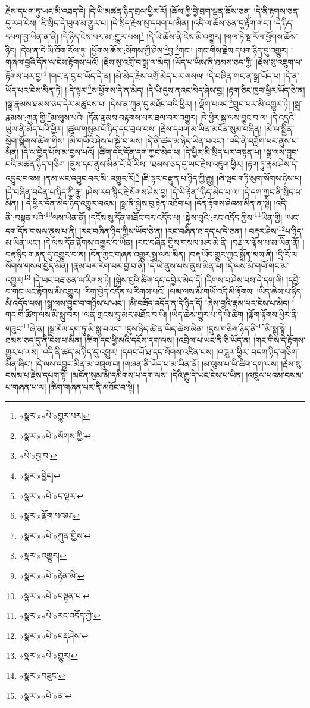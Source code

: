 རྗེས་དཔག་ཏུ་ཡང་མི་འཐད་དེ། །དེ་ཡི་མཚན་ཉིད་བྲལ་ཕྱིར་རོ། །ཆོས་ཀྱི་བྱེ་བྲག་ལྡན་ཆོས་ཅན། །དེ་ནི་རྟགས་ཅན་དུ་རབ་ངེས། །ཇི་སྲིད་དེ་ཡུལ་མ་གྱུར་པ། །དེ་སྲིད་རྗེས་སུ་དཔག་པ་མིན། །འདི་ལ་ཆོས་ཅན་དུ་རྟོག་གང་། །དེ་ཉིད་དཔག་བྱ་ཡིན་ན་ནི། །དེ་ཉིད་ངེས་པར་མ་:གྱུར་པས།\footnote{«སྣར་»«པེ་»གྱུར་པར།} །དེ་ཡི་ཆོས་ནི་ངེས་མི་འགྱུར། །གལ་ཏེ་སྔ་རོལ་ཕྱོགས་ཆོས་ཉིད། །དེས་ན་དེ་ཡི་འོག་རོལ་ཏུ། །ཕྱོགས་ཆོས་:སོགས་ཀྱི་ཤེས་\footnote{«སྣར་»«པེ་»སོགས་ཀྱི་}བྱ་\footnote{«པེ་»བྱ་བ་}གང་། །གང་གིས་རྗེས་དཔག་ཉིད་དུ་འགྱུར། །གཞལ་བྱའི་དོན་ལ་ངེས་རྟོགས་པའོ། །རྗེས་སུ་འགྲོ་བ་སྒྲ་ལ་མེད། །ཡོད་པ་ཡིས་ནི་ཐམས་ཅད་ཀྱི། །རྗེས་སུ་འཇུག་པ་རྟོགས་པར་བྱ།\footnote{«སྣར་»བྱེད།} །གང་ན་དུ་བ་ཡོད་དེ་ན། །མེ་མེད་རྗེས་འགྲོ་མེད་པར་གསལ། །དེ་བཞིན་གང་ན་སྒྲ་ཡོད་པ། །དེ་ན་ཡོད་པར་ངེས་མིན་ཏེ། །:དེ་ལྟར་\footnote{«སྣར་»«པེ་»ད་ལྟར་}ས་ཕྱོགས་དེ་ན་མེད། །དེ་ཡི་དུས་ནའང་མེད་ཤེས་བྱ། །རྟག་ཅིང་ཁྱབ་ཕྱིར་ཡོད་ཅེ་ན། །སྒྲ་རྣམས་ཐམས་ཅད་དེར་མཚུངས་པ། །དེས་ན་ཀུན་དུ་མཐོང་བའི་ཕྱིར། །:ལྡོག་པའང་\footnote{«སྣར་»ལྡོག་པའམ་}གྲུབ་པར་མི་འགྱུར་ཏེ། །སྒྲ་རྣམས་:ཀུན་གྱི་\footnote{«སྣར་»«པེ་»ཀུན་གྱིས་}མ་ལུས་པའི། །དོན་རྣམས་བརྟགས་པར་ཐལ་བར་འགྱུར། །དེ་ཕྱིར་སྒྲ་ལས་བྱུང་བ་ལ། །དེ་འདྲའི་ཡུལ་ནི་མེད་པའི་ཕྱིར། །ཚུལ་གསུམ་པོ་ཉིད་དང་བྲལ་བས། །རྗེས་དཔག་མ་ཡིན་མངོན་སུམ་བཞིན། །མེ་ལ་སྦྱིན་སྲེག་སྩོགས་ཚིག་གིས། །མི་གཡོའི་ཤེས་པ་སྐྱེ་བ་ལས། །དེ་ནི་ཚད་མ་ཉིད་ཡིན་པའང་། །འདི་ནི་བཟློག་པར་ནུས་པ་མིན། །དེ་ལ་བྱེད་པོས་མ་བྱས་པའོ། །ཚིག་དང་དོན་དག་ཀྱང་མེད་པ། །དེ་ཕྱིར་མི་སྲིད་པར་བསྟན་པ། །སྒྲ་ལས་བྱུང་བའི་མཚན་ཉིད་གཅིག །ནུས་དང་ནུས་མིན་ངོ་བོ་ཡིས། །ཐམས་ཅད་དུ་ཡང་རྗེས་འཇུག་ཕྱིར། །རྟག་ཏུ་རྣམ་ཤེས་དེ་འབྱུང་བའམ། །ནམ་ཡང་འབྱུང་བར་མི་:འགྱུར་རོ།\footnote{«སྣར་»འགྱུར།} །ཇི་ལྟར་བརྫུན་པ་ཉིད་ཀྱི་རྒྱུ། །ཞེ་སྡང་གཏི་མུག་སོགས་ཉེས་པ། །དེ་བཞིན་བདེན་པ་ཉིད་ཀྱི་རྒྱུ། །ཤེས་རབ་སྙིང་རྗེ་སོགས་ཤེས་བྱ། །དེ་ཡི་རྟེན་\footnote{«སྣར་»«པེ་»རྟེན་མི་}ཉིད་མེད་པ་ལ། །དེ་དག་ཀྱང་ནི་སྲིད་པ་མིན། །
དེ་ཕྱིར་དོན་མེད་ཉིད་འགྱུར་བའམ། །སྒྲ་ནི་སྐྱེས་བུ་རྟེན་འཐོབ་པ། །དོན་རྟོགས་ཤེའམ་མིན་ན་སྟེ། །འདི་ནི་:བསྟན་པའི་\footnote{«སྣར་»«པེ་»བསྟན་པ་}ལས་ཡིན་ནོ། །དངོས་སུ་དོན་མཐོང་བར་འདོད་པ། །སྐྱེས་བུའི་:རང་འདོད་ཀྱིས་\footnote{«སྣར་»«པེ་»རང་འདོད་ཀྱི་}ཡིན་གྱི། །ཡང་དག་དོན་གསལ་ནུས་པ་ནི། །རང་བཞིན་ཉིད་ཀྱིས་ཡོད་ཅེ་ན། །རང་བཞིན་ཐ་དད་པ་དེ་ཅན། །:བརྡར་ཤེས་\footnote{«སྣར་»«པེ་»བརྡ་ཤེས་}པ་ཉིད་མ་ཡིན་ཡང་། །དེ་ལས་དོན་རྟོགས་འགྱུར་བ་ཡིན། །རང་བཞིན་གྱིས་གསལ་མར་མེ་ནི། །བརྡ་ལ་ལྟོས་པ་མ་ཡིན་ནོ། །བརྡ་ཉིད་གཞན་དུ་འགྱུར་བ་ན། །དོན་ཀྱང་གཞན་འགྱུར་སྒྲ་ལས་མིན། །བརྡ་ཡོད་གྱུར་ཀྱང་སྒྲོན་མས་ནི། །དྲི་རོ་ལ་སོགས་གསལ་བྱེད་མིན། །རྣམ་པར་རིག་པར་བྱ་བ་ནི། །དེ་ཡི་ནུས་པས་ནུས་མིན་པ། །དེ་ལས་མི་གཡོ་གང་མ་འགྱུར།\footnote{«སྣར་»«པེ་»གྱུར།} །དེ་ཡང་བརྡ་ཅན་ལ་རིགས་ཏེ། །སྐྱེས་བུའི་ཚིག་དང་དབྱེར་མེད་དོ། །རིགས་པ་ཤེས་པས་དེ་དག་གི། །དབྱེ་བ་གང་ཡང་རྟོགས་མི་འགྱུར། །རིག་བྱེད་འདོན་པ་རིགས་པའོ། །ལམ་ལས་མི་གཡོ་འདི་མི་རྟོགས། །ཡིད་ཆེས་པ་ཉིད་མི་འདོད་པས། །སྒྲ་ལས་བྱུང་བ་གཉིས་པ་ཡང་། །མི་བཟོད་འདོད་ན་དེ་ཉིད་དོ། །ཞེས་བྱའི་རྣམ་པར་ངེས་པ་མེད། །གང་གི་ཚིག་ལས་མི་སླུ་བར། །ལན་གྲངས་དུ་མར་མཐོང་བ་ཡི། །ཡིད་ཆེས་གྱུར་པ་དེ་ཡི་ཚིག །ལྐོག་རྟོགས་ཕྱིར་ནི་གཟུང་\footnote{«སྣར་»བཟུང་}ཞེ་ན། །སྔ་རོལ་དག་ཏུ་མི་སླུ་བའང་། །དུས་ཉིད་ཚེ་ན་ཡིད་ཆེས་མིན། །དུས་གཅིག་ཉིད་ནི་\footnote{«སྣར་»«པེ་»ན་}མི་སླུ་སྟེ། །ཐམས་ཅད་དུ་ནི་ངེས་པ་མིན། །ཚིག་དང་ཕྱི་མའི་དངོས་དག་ལས། །འབྲེལ་པ་ཡང་ནི་ཅི་ཡོད་ན། །གང་གིས་དེ་རྟོགས་གྱུར་པ་ལས། །འདི་ནི་ཚད་མ་ཉིད་དུ་འགྱུར། །དབང་པོ་ཐ་དད་སོགས་འཛིན་པས། །འཁྲུལ་ཕྱིར་:བདག་ཉིད་གཅིག་མིན་ཞིང་། །དེ་ལས་འབྱུང་མིན་མ་འཁྲུལ་བ། །གཞན་ནི་ཡོད་པ་མ་ཡིན་ནོ། །མ་ལུས་པ་ཡི་ཚིག་དག་ལས། །རྗེས་སུ་བསམ་པ་རྗེས་དཔག་སྟེ། །མངོན་སུམ་མི་དམིགས་པ་དག་ལས། །དེའི་རྒྱུ་དེ་ཡང་ངེས་པ་ཡིན། །འཁྲུལ་པའམ་བསམ་པ་གཞན་པ་ལ། །ཚིག་གཞན་པར་ནི་མཐོང་བ་སྟེ། །
